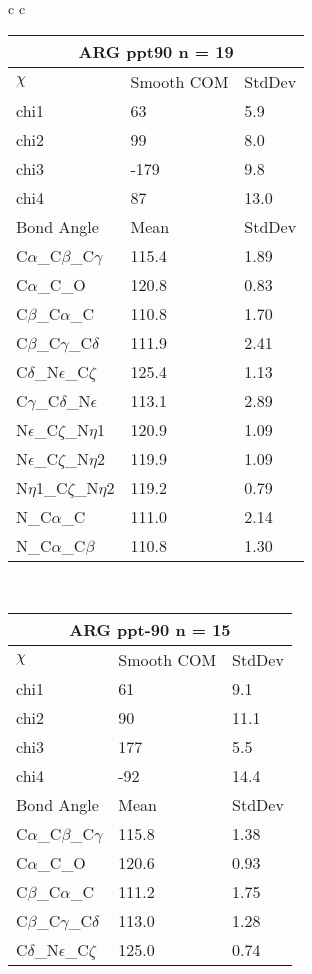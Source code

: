 \begin{longtable}{ c c }
\begin{tabular}{ l l l }
  \toprule
  \multicolumn{3}{c}{ARG \textbf{ppt90} n = 19} \\ \toprule
  $\chi$       & Smooth COM & StdDev \\ \midrule
  chi1 & 63 & 5.9 \\ 
  chi2 & 99 & 8.0 \\ 
  chi3 & -179 & 9.8 \\ 
  chi4 & 87 & 13.0 \\ \midrule
  Bond Angle   & Mean     & StdDev \\ \midrule
  C$\alpha$\_C$\beta$\_C$\gamma$ & 115.4 & 1.89\\
  C$\alpha$\_C\_O & 120.8 & 0.83\\
  C$\beta$\_C$\alpha$\_C & 110.8 & 1.70\\
  C$\beta$\_C$\gamma$\_C$\delta$ & 111.9 & 2.41\\
  C$\delta$\_N$\epsilon$\_C$\zeta$ & 125.4 & 1.13\\
  C$\gamma$\_C$\delta$\_N$\epsilon$ & 113.1 & 2.89\\
  N$\epsilon$\_C$\zeta$\_N$\eta$1 & 120.9 & 1.09\\
  N$\epsilon$\_C$\zeta$\_N$\eta$2 & 119.9 & 1.09\\
  N$\eta$1\_C$\zeta$\_N$\eta$2 & 119.2 & 0.79\\
  N\_C$\alpha$\_C & 111.0 & 2.14\\
  N\_C$\alpha$\_C$\beta$ & 110.8 & 1.30\\
  \bottomrule
  \end{tabular}
  \\
  \begin{tabular}{ l l l }
  \toprule
  \multicolumn{3}{c}{ARG \textbf{ppt-90} n = 15} \\ \toprule
  $\chi$       & Smooth COM & StdDev \\ \midrule
  chi1 & 61 & 9.1 \\ 
  chi2 & 90 & 11.1 \\ 
  chi3 & 177 & 5.5 \\ 
  chi4 & -92 & 14.4 \\ \midrule
  Bond Angle   & Mean     & StdDev \\ \midrule
  C$\alpha$\_C$\beta$\_C$\gamma$ & 115.8 & 1.38\\
  C$\alpha$\_C\_O & 120.6 & 0.93\\
  C$\beta$\_C$\alpha$\_C & 111.2 & 1.75\\
  C$\beta$\_C$\gamma$\_C$\delta$ & 113.0 & 1.28\\
  C$\delta$\_N$\epsilon$\_C$\zeta$ & 125.0 & 0.74\\

\end{tabular}
\end{longtable}
